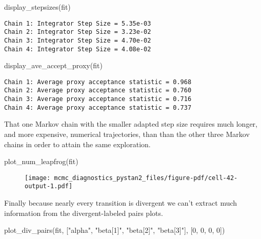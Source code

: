 \documentclass[
  letterpaper,
  DIV=11,
  numbers=noendperiod]{scrartcl}
\newenvironment{Shaded}{\begin{snugshade}}{\end{snugshade}}
\newcommand{\DecValTok}[1]{\textcolor[rgb]{0.68,0.00,0.00}{#1}}
\newcommand{\NormalTok}[1]{\textcolor[rgb]{0.00,0.23,0.31}{#1}}
\newcommand{\StringTok}[1]{\textcolor[rgb]{0.13,0.47,0.30}{#1}}
\begin{document}
\begin{Shaded}
\begin{Highlighting}[]
\NormalTok{display\_stepsizes(fit)}
\end{Highlighting}
\end{Shaded}

\begin{verbatim}
Chain 1: Integrator Step Size = 5.35e-03
Chain 2: Integrator Step Size = 3.23e-02
Chain 3: Integrator Step Size = 4.70e-02
Chain 4: Integrator Step Size = 4.08e-02
\end{verbatim}

\begin{Shaded}
\begin{Highlighting}[]
\NormalTok{display\_ave\_accept\_proxy(fit)}
\end{Highlighting}
\end{Shaded}

\begin{verbatim}
Chain 1: Average proxy acceptance statistic = 0.968
Chain 2: Average proxy acceptance statistic = 0.760
Chain 3: Average proxy acceptance statistic = 0.716
Chain 4: Average proxy acceptance statistic = 0.737
\end{verbatim}

That one Markov chain with the smaller adapted step size requires much
longer, and more expensive, numerical trajectories, than than the other
three Markov chains in order to attain the same exploration.

\begin{Shaded}
\begin{Highlighting}[]
\NormalTok{plot\_num\_leapfrog(fit)}
\end{Highlighting}
\end{Shaded}

\begin{figure}[H]

{\centering \texttt{[image: mcmc\_diagnostics\_pystan2\_files/figure-pdf/cell-42-output-1.pdf]}

}

\end{figure}

Finally because nearly every transition is divergent we can't extract
much information from the divergent-labeled pairs plots.

\begin{Shaded}
\begin{Highlighting}[]
\NormalTok{plot\_div\_pairs(fit,}
\NormalTok{               [}\StringTok{"alpha"}\NormalTok{, }\StringTok{"beta[1]"}\NormalTok{, }\StringTok{"beta[2]"}\NormalTok{, }\StringTok{"beta[3]"}\NormalTok{],}
\NormalTok{               [}\DecValTok{0}\NormalTok{, }\DecValTok{0}\NormalTok{, }\DecValTok{0}\NormalTok{, }\DecValTok{0}\NormalTok{])}
\end{Highlighting}
\end{Shaded}
\end{document}
